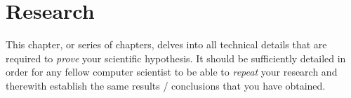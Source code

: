 \chapter{Research}\label{research}
This chapter, or series of chapters, delves into all technical details that are
required to \emph{prove} your scientific hypothesis.
It should be sufficiently detailed in order for any fellow computer scientist to be able to \emph{repeat}
your research and therewith establish the same results / conclusions that you have obtained.
